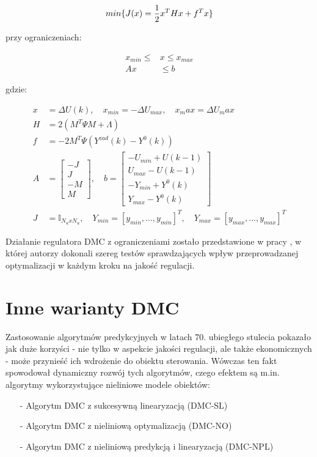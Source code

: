 \begin{equation}
min \{J(x) = \frac{1}{2} x^T Hx + f^T x\} \\
\end{equation} 

\noindent przy ograniczeniach:

\begin{equation}
\begin{aligned}
x_{min} \leq &x \leq x_{max} \\
Ax &\leq b
\end{aligned}
\end{equation}

\newpage

\noindent gdzie:

\begin{equation}
\begin{aligned}
x &= \Delta U(k), \quad x_{min} = -\Delta U_{max}, \quad x_max = \Delta U_max \\
H &= 2(M^T \Psi M + \Lambda) \\
f &= -2M^T \Psi (Y^{zad}(k) - Y^0(k)) \\
A &= \begin{bmatrix}
-J \\ J \\ -M \\ M
\end{bmatrix}, \quad
b = \begin{bmatrix}
-U_{min} + U(k-1) \\ U_{max} - U(k-1) \\ 
-Y_{min} + Y^0(k) \\ Y_{max} - Y^0(k) 	 	
\end{bmatrix} \\
J &= \mathbb{I}_{N_u x N_u}, \quad Y_{min} = [y_{min}, ..., y_{min}]^T, \quad Y_{max} = [y_{max}, ..., y_{max}]^T
\end{aligned}
\end{equation}

Działanie regulatora DMC z ograniczeniami zostało przedstawione w pracy \cite{50}, w której autorzy dokonali szereg testów sprawdzających wpływ przeprowadzanej optymalizacji w każdym kroku na jakość regulacji.

\section{Inne warianty DMC}
Zastosowanie algorytmów predykcyjnych w latach 70. ubiegłego stulecia pokazało jak duże korzyści - nie tylko w aspekcie jakości regulacji, ale także ekonomicznych - może przynieść ich wdrożenie do obiektu sterowania. Wówczas ten fakt spowodował dynamiczny rozwój tych algorytmów, czego efektem są m.in. algorytmy wykorzystujące nieliniowe modele obiektów:
\begin{itemize}
\item[-] Algorytm DMC z sukcesywną linearyzacją (DMC-SL)
\item[-] Algorytm DMC z nieliniową optymalizacją (DMC-NO)
\item[-] Algorytm DMC z nieliniową predykcją i linearyzacją (DMC-NPL)
\end{itemize}

